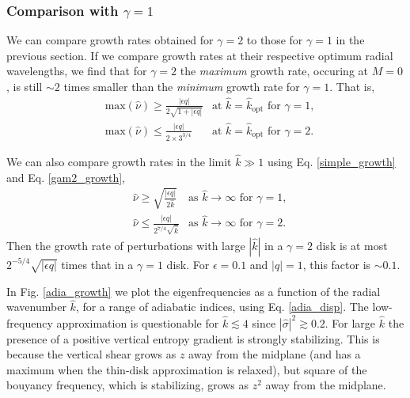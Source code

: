 \subsubsection{Comparison with $\gamma=1$}
We can compare growth rates obtained for $\gamma=2$ to those for
$\gamma=1$ in the previous section. If we compare growth rates at their 
respective optimum radial wavelengths, we find
that for $\gamma=2$ the \emph{maximum} growth rate, occuring
at $M=0$, is still $\sim2$ times smaller than the \emph{minimum} growth
rate for $\gamma=1$. That is,
\begin{align}
  &\mathrm{max}(\hat{\nu}) \geq \frac{|\epsilon q|}{2\sqrt{1+|\epsilon
      q|}} & \text{at }\hat{k} = \hat{k}_\mathrm{opt} \text{ for }   \gamma=1,  \\
  &\mathrm{max}(\hat{\nu}) \leq \frac{|\epsilon q|}{2\times 3^{3/4}}
           & \text{at }\hat{k} = \hat{k}_\mathrm{opt} \text{ for } \gamma=2.
\end{align}

We can also compare growth rates in the limit $\hat{k}\gg1$ using
Eq. \ref{simple_growth} and Eq. \ref{gam2_growth},
\begin{align}
  &\hat{\nu} \geq \sqrt{\frac{|\epsilon q|}{2\hat{k}}}
  &  \text{as }  \hat{k}\to\infty  \text{ for }  \gamma=1, \\
  &\hat{\nu} \leq \frac{|\epsilon q|}{2^{7/4}\sqrt{\hat{k}}}
  &\text{as }  \hat{k}\to\infty  \text{ for }  \gamma=2.\label{gam2_growth_rate}
\end{align}
Then the growth rate of perturbations with large $|\hat{k}|$ in a
$\gamma=2$ disk is at most $2^{-5/4}\sqrt{|\epsilon q|}$ times that in a
$\gamma=1$ disk. For $\epsilon = 0.1$ and $|q|=1$, this factor is
$\sim 0.1$.  

In Fig. \ref{adia_growth} we plot the eigenfrequencies as a
function of the radial wavenumber $\hat{k}$, for a range of adiabatic
indices, using Eq. \ref{adia_disp}. The low-frequency approximation
is questionable for $\hat{k}\lesssim4$ since
$|\hat{\sigma}|^2\gtrsim0.2$. For large $\hat{k}$ the presence of a
positive vertical entropy gradient is strongly stabilizing. This is
because the vertical shear grows as $z$ away from the midplane (and
has a maximum when the thin-disk approximation is relaxed), but square
of the bouyancy frequency, which is stabilizing, grows as $z^2$ away
from the midplane. %

